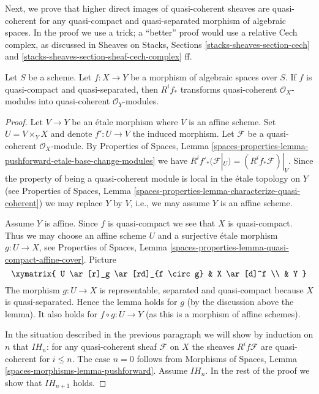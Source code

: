 \medskip\noindent
Next, we prove that higher direct images of quasi-coherent sheaves are
quasi-coherent for any quasi-compact and quasi-separated morphism of
algebraic spaces. In the proof we use a trick; a ``better'' proof would
use a relative Cech complex, as discussed in
Sheaves on Stacks, Sections \ref{stacks-sheaves-section-cech} and
\ref{stacks-sheaves-section-sheaf-cech-complex} ff.

\begin{lemma}
\label{lemma-higher-direct-image}
Let $S$ be a scheme. Let $f : X \to Y$ be a morphism of algebraic spaces
over $S$. If $f$ is quasi-compact and quasi-separated, then $R^if_*$
transforms quasi-coherent $\mathcal{O}_X$-modules into
quasi-coherent $\mathcal{O}_Y$-modules.
\end{lemma}

\begin{proof}
Let $V \to Y$ be an \'etale morphism where $V$ is an affine scheme. Set
$U = V \times_Y X$ and denote $f' : U \to V$ the induced morphism.
Let $\mathcal{F}$ be a quasi-coherent $\mathcal{O}_X$-module. By
Properties of Spaces, Lemma
\ref{spaces-properties-lemma-pushforward-etale-base-change-modules}
we have
$R^if'_*(\mathcal{F}|_U) = (R^if_*\mathcal{F})|_V$.
Since the property of being a quasi-coherent module is local in the
\'etale topology on $Y$ (see
Properties of Spaces, Lemma
\ref{spaces-properties-lemma-characterize-quasi-coherent})
we may replace $Y$ by $V$, i.e., we may assume $Y$ is an affine scheme.

\medskip\noindent
Assume $Y$ is affine. Since $f$ is quasi-compact we see that $X$
is quasi-compact. Thus we may choose an affine scheme $U$ and a surjective
\'etale morphism $g : U \to X$, see
Properties of Spaces,
Lemma \ref{spaces-properties-lemma-quasi-compact-affine-cover}.
Picture
$$
\xymatrix{
U \ar[r]_g \ar[rd]_{f \circ g} & X \ar[d]^f \\
& Y
}
$$
The morphism $g : U \to X$ is representable, separated
and quasi-compact because $X$ is quasi-separated. Hence the lemma
holds for $g$ (by the discussion above the lemma).
It also holds for $f \circ g : U \to Y$ (as this is a morphism
of affine schemes).

\medskip\noindent
In the situation described in the previous paragraph we will show by
induction on $n$ that $IH_n$: for any quasi-coherent sheaf $\mathcal{F}$
on $X$ the sheaves $R^if\mathcal{F}$
are quasi-coherent for $i \leq n$.
The case $n = 0$ follows from
Morphisms of Spaces, Lemma \ref{spaces-morphisms-lemma-pushforward}.
Assume $IH_n$. In the rest of the proof we show that $IH_{n + 1}$ holds.


\end{proof}
